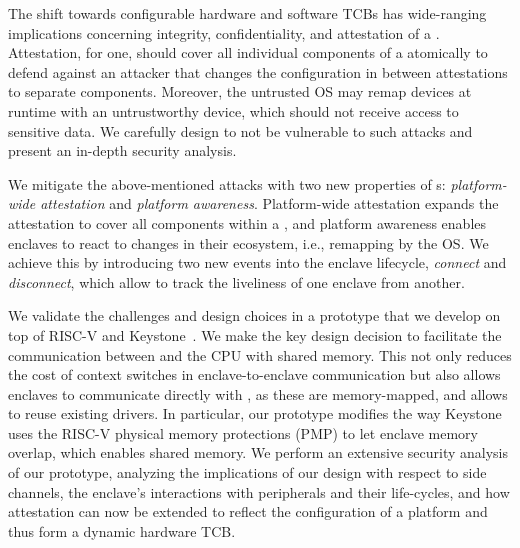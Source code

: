 The shift towards configurable hardware and software TCBs has wide-ranging implications concerning integrity, confidentiality, and attestation of a \nameenclave{}. 
Attestation, for one, should cover all individual components of a \nameenclave{} atomically to defend against an attacker that changes the configuration in between attestations to separate components. 
Moreover, the untrusted OS may remap \sphw devices at runtime with an untrustworthy device, which should not receive access to sensitive data. We carefully design \name{} to not be vulnerable to such attacks and present an in-depth security analysis.

We mitigate the above-mentioned attacks with two new properties of \nameenclave{}s: \emph{platform-wide attestation} and \emph{platform awareness}. Platform-wide attestation expands the attestation to cover all components within a \nameenclave, and platform awareness enables enclaves to react to changes in their ecosystem, i.e., remapping by the OS.
We achieve this by introducing two new events into the enclave lifecycle, \textit{connect} and \textit{disconnect}, which allow to track the liveliness of one enclave from another.

We validate the challenges and design choices in a prototype that we develop on top of RISC-V and Keystone~\cite{keystone}. We make the key design decision to facilitate the communication between \sphw and the CPU with shared memory. This not only reduces the cost of context switches in enclave-to-enclave communication but also allows enclaves to communicate directly with \sphw, as these are memory-mapped, and allows to reuse existing drivers. In particular, our prototype modifies the way Keystone uses the RISC-V physical memory protections (PMP) to let enclave memory overlap, which enables shared memory. 
We perform an extensive security analysis of our prototype, analyzing the implications of our design with respect to side channels, the enclave's interactions with peripherals and their life-cycles, and how attestation can now be extended to reflect the configuration of a platform and thus form a dynamic hardware TCB. 


